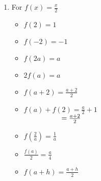 \documentclass{ximera}
\begin{document}
\begin{enumerate}
\item For $f(x) = \frac{x}{2}$

\begin{multicols}{3}
\begin{itemize}

\item  $f(2) = 1$
\item  $f(-2) = -1$
\item  $f(2a) = a$

\end{itemize}
\end{multicols}

\begin{multicols}{3}
\begin{itemize}

\item  $2 f(a) = a$

\item $f(a+2) = \frac{a+2}{2}$

\vfill

\columnbreak

\item $f(a) + f(2) = \frac{a}{2}+ 1$ \\
      $\hphantom{f(a) + f(2)} = \frac{a+2}{2}$

\end{itemize}
\end{multicols}

\begin{multicols}{3}
\begin{itemize}

\item  $f \left( \frac{2}{a} \right) = \frac{1}{a}$

\vfill

\columnbreak

\item $\frac{f(a)}{2} =  \frac{a}{4}$

\vfill

\columnbreak


\item  $f(a + h) = \frac{a+h}{2}$

\end{itemize}
\end{multicols}




\setcounter{HW}{\value{enumi}}
\end{enumerate}
\end{document}
